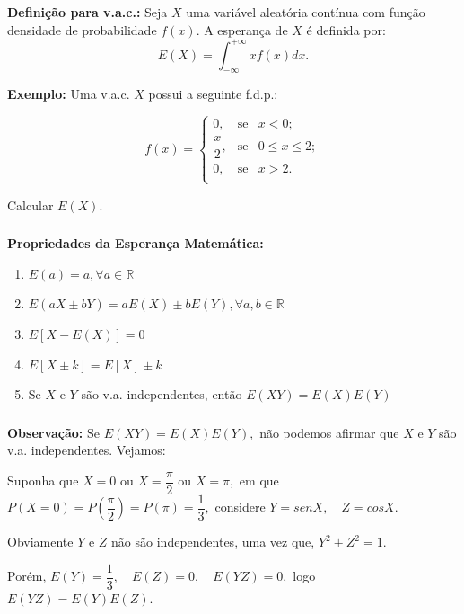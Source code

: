 \documentclass[14pt,aspectratio=1610]{beamer}
\begin{document}
\begin{frame}{}
\frametitle{}
\begin{block}{}
\justifying
\textbf{Definição para v.a.c.:} Seja $X$ uma variável aleatória contínua com função densidade de probabilidade $f(x)$. A esperança de $X$ é definida por: 
$$\displaystyle E(X)=\int_{-\infty}^{+\infty}xf(x)dx.$$

\textbf{Exemplo:} Uma v.a.c. $X$ possui a seguinte f.d.p.:

$$
f(x)=\left\{
\begin{array}{ccccc}
0,           & \textrm{se} & x<0     ;\\
\dfrac{x}{2},& \textrm{se} & 0\leq x\leq 2;\\
0,           & \textrm{se} & x> 2 .\\
\end{array}
\right.
$$

Calcular $E(X).$

\end{block}
\end{frame}

\begin{frame}{}
\frametitle{}
\begin{block}{}
\justifying
\textbf{Propriedades da Esperança Matemática:}
\begin{enumerate}
\item $E(a)=a, \forall a\in \mathbb{R}$\pause
\item $E(aX\pm bY)=aE(X)\pm bE(Y), \forall a,b\in \mathbb{R}$\pause
\item $E[X-E(X)]=0$\pause
\item $E[X \pm k]=E[X]\pm k$\pause
\item Se $X$ e $Y$ são v.a. independentes, então $E(XY)=E(X)E(Y)$
\end{enumerate}
\end{block}
\end{frame}

\begin{frame}{}
\frametitle{}
\begin{block}{}
\justifying
\textbf{Observação:} Se $E(XY)=E(X)E(Y),$ não podemos afirmar que $X$ e $Y$ são v.a. independentes. Vejamos:

Suponha que $X=0$ ou $X=\dfrac{\pi}{2}$ ou $X=\pi,$ em que 
$P(X=0)=P(\dfrac{\pi}{2})=P(\pi)=\dfrac{1}{3},$ considere $Y=senX,\quad Z=cosX.$

Obviamente $Y$ e $Z$ não são independentes, uma vez que, $Y^{2}+Z^{2}=1.$ 

Porém, $E(Y)=\dfrac{1}{3},\quad E(Z)=0,\quad E(YZ)=0,$ logo $E(YZ)=E(Y)E(Z).$

\end{block}
\end{frame}
\end{document}
